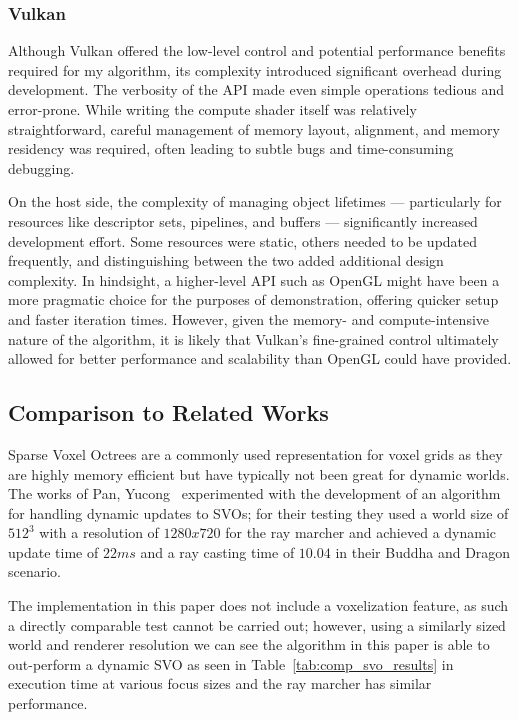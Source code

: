 \subsubsection{Vulkan}
Although Vulkan offered the low-level control and potential performance benefits required for my algorithm, its
complexity introduced significant overhead during development. The verbosity of the API made even simple operations
tedious and error-prone. While writing the compute shader itself was relatively straightforward, careful management of
memory layout, alignment, and memory residency was required, often leading to subtle bugs and time-consuming debugging.

On the host side, the complexity of managing object lifetimes — particularly for resources like descriptor sets,
pipelines, and buffers — significantly increased development effort. Some resources were static, others needed to be
updated frequently, and distinguishing between the two added additional design complexity. In hindsight, a higher-level
API such as OpenGL might have been a more pragmatic choice for the purposes of demonstration, offering quicker setup and
faster iteration times. However, given the memory- and compute-intensive nature of the algorithm, it is likely that
Vulkan's fine-grained control ultimately allowed for better performance and scalability than OpenGL could have provided.

\subsection{Comparison to Related Works}
Sparse Voxel Octrees are a commonly used representation for voxel grids as they are highly memory efficient but have
typically not been great for dynamic worlds. The works of Pan, Yucong~\cite{pan2021dynamic} experimented with the
development of an algorithm for handling dynamic updates to SVOs; for their testing they used a world size of $512^3$
with a resolution of $1280x720$ for the ray marcher and achieved a dynamic update time of $22ms$ and a ray casting time
of $10.04$ in their Buddha and Dragon scenario.

The implementation in this paper does not include a voxelization feature, as such a directly comparable test cannot be
carried out; however, using a similarly sized world and renderer resolution we can see the algorithm in this paper is
able to out-perform a dynamic SVO as seen in Table~\ref{tab:comp_svo_results} in execution time at various focus sizes and
the ray marcher has similar performance.

